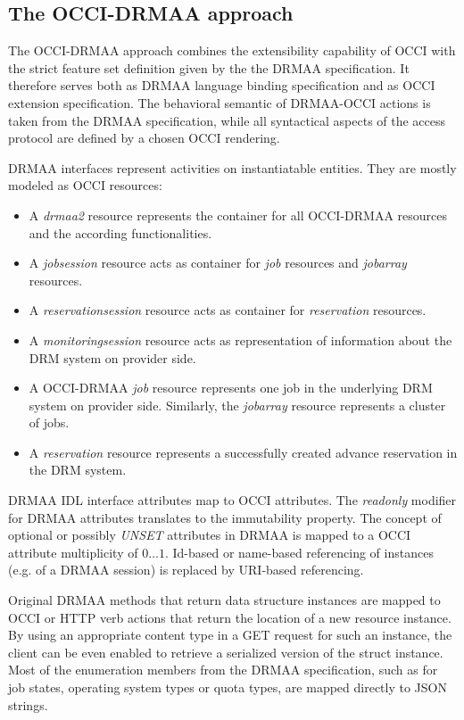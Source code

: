 \documentclass[twocolumn]{svjour3}       %
\begin{document}
\subsection{The OCCI-DRMAA approach}

The OCCI-DRMAA approach combines the extensibility capability of OCCI with the strict feature set definition given by the the DRMAA specification. It therefore serves both as DRMAA language binding specification and as OCCI extension specification. The behavioral semantic of DRMAA-OCCI actions is taken from the DRMAA specification, while all syntactical aspects of the access protocol are defined by a chosen OCCI rendering.

DRMAA interfaces represent activities on instantiatable entities. They are mostly modeled as OCCI resources:

\begin{itemize}
\item A \emph{drmaa2} resource represents the container for all OCCI-DRMAA resources and the according functionalities. 
\item A \emph{jobsession} resource acts as container for \emph{job} resources and \emph{jobarray} resources. 
\item A \emph{reservationsession} resource acts as container for \emph{reservation} resources. 
\item A \emph{monitoringsession} resource acts as representation of information about the DRM system on provider side. 
\item A OCCI-DRMAA \emph{job} resource represents one job in the underlying DRM system on provider side. Similarly, the \emph{jobarray} resource represents a cluster of jobs.
\item A \emph{reservation} resource represents a successfully created advance reservation in the DRM system.
\end{itemize}

DRMAA IDL interface attributes map to OCCI attributes. The \emph{readonly} modifier for DRMAA attributes translates to the immutability property. The concept of optional or possibly \emph{UNSET} attributes in DRMAA is mapped to a OCCI attribute multiplicity of $0\ldots1$. Id-based or name-based referencing of instances (e.g. of a DRMAA session) is replaced by URI-based referencing.

Original DRMAA methods that return data structure instances are mapped to OCCI or HTTP verb actions that return the location of a new resource instance. By using an appropriate content type in a GET request for such an instance, the client can be even enabled to retrieve a serialized version of the struct instance. Most of the enumeration members from the DRMAA specification, such as for job states, operating system types or quota types, are mapped directly to JSON strings. 
\end{document}
